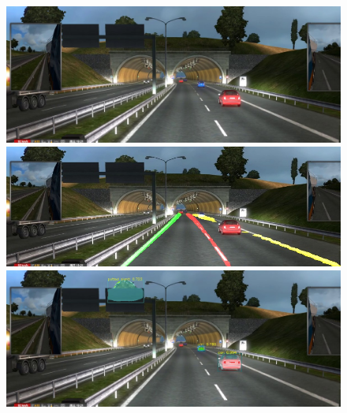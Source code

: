 \documentclass[runningheads]{llncs}
\begin{document}
\begin{figure}[!htb]
	\includegraphics[width=\linewidth]{result/w000106.jpg}
	\endminipage\hfill
	\includegraphics[width=\linewidth]{result/w000106-lane.jpg}
	\endminipage\hfill
	\includegraphics[width=\linewidth]{result/w000106-obj.jpg}
	\endminipage


\end{figure}
\end{document}
